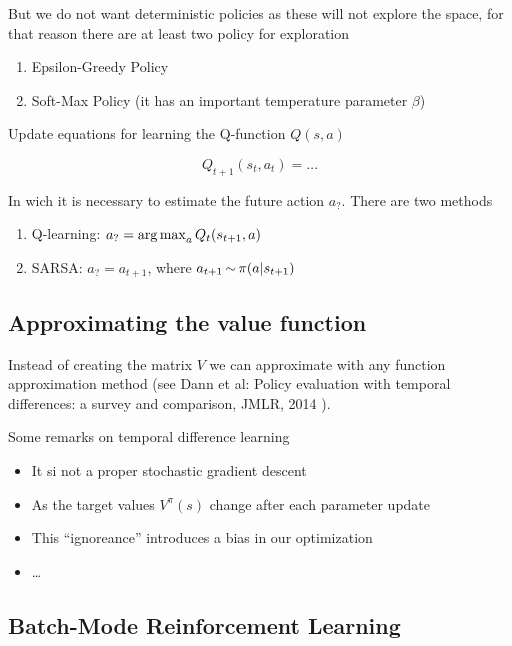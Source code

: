 \documentclass[b5paper]{report}
\begin{document}
But we do not want deterministic policies as these will not explore the space,
for that reason there are at least two policy for exploration

\begin{enumerate}
  \item Epsilon-Greedy Policy
  \item Soft-Max Policy (it has an important temperature parameter $\beta$)
\end{enumerate}

Update equations for learning the Q-function $Q(s,a)$

\begin{equation}
  Q_{t+1}(s_t,a_t) =  \dots
\end{equation}

In wich it is necessary to estimate the future action $a_?$. There are two
methods

\begin{enumerate}
  \item Q-learning: $a_? = \operatorname*{arg\,max}_a Q_t(s_{t+1}, a)$
  \item SARSA: $a_? = a_{t+1}$, where $a_{t+1} \operatorname*{\sim} \pi(a|s_{t+1})$
\end{enumerate}

\subsection{Approximating the value function}

Instead of creating the matrix $V$ we can approximate with any function
approximation method (see Dann et al: Policy evaluation with temporal
differences: a survey and comparison, JMLR, 2014 \cite{dann2014policy}).

Some remarks on temporal difference learning

\begin{itemize}
  \item It si not a proper stochastic gradient descent
  \item As the target values $V^\pi(s)$ change after each parameter update
  \item This ``ignoreance'' introduces a bias in our optimization
  \item \dots
\end{itemize}

\subsection{Batch-Mode Reinforcement Learning}
\end{document}
